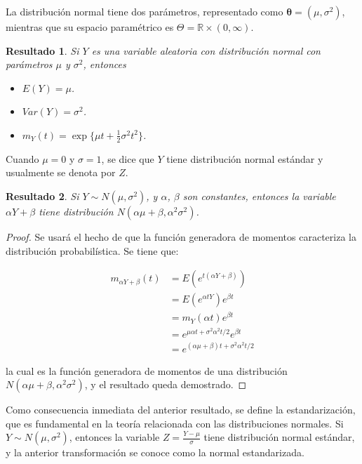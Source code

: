 \documentclass[
  10pt,
  spanish,
]{book}
\providecommand{\tightlist}{%
  \setlength{\itemsep}{0pt}\setlength{\parskip}{0pt}}
\newtheorem{proposition}{Resultado}[chapter]
\theoremstyle{definition}
\theoremstyle{definition}
\theoremstyle{definition}
\theoremstyle{definition}
\theoremstyle{remark}
\begin{document}
La distribución normal tiene dos parámetros, representado como \(\boldsymbol \theta=(\mu,\sigma^2)\), mientras que su espacio paramétrico es \(\Theta=\mathbb{R}\times(0,\infty)\).

\begin{proposition}
\protect\hypertarget{prp:unnamed-chunk-33}{}{\label{prp:unnamed-chunk-33} }Si \(Y\) es una variable aleatoria con distribución normal con parámetros \(\mu\) y \(\sigma^2\), entonces

\begin{itemize}
\tightlist
\item
  \(E(Y)=\mu\).
\item
  \(Var(Y)=\sigma^2\).
\item
  \(m_Y(t)=\exp\{\mu t+\frac{1}{2}\sigma^2t^2\}\).
\end{itemize}
\end{proposition}

Cuando \(\mu=0\) y \(\sigma=1\), se dice que \(Y\) tiene distribución normal estándar y usualmente se denota por \(Z\).

\begin{proposition}
\protect\hypertarget{prp:unnamed-chunk-34}{}{\label{prp:unnamed-chunk-34} }Si \(Y\sim N(\mu,\sigma^2)\), y \(\alpha\), \(\beta\) son constantes, entonces la variable \(\alpha Y+\beta\) tiene distribución \(N(\alpha\mu+\beta,\alpha^2\sigma^2)\).
\end{proposition}

\begin{proof}
{}Se usará el hecho de que la función generadora de momentos caracteriza la distribución probabilística. Se tiene que:

\begin{align*}
m_{\alpha Y+\beta}(t)&=E(e^{t(\alpha Y+\beta)})\\
                     &=E(e^{\alpha tY})e^{\beta t}\\
                     &=m_Y(\alpha t)e^{\beta t}\\
                     &=e^{\mu\alpha t+\sigma^2\alpha^2t/2}e^{\beta t}\\
                     &=e^{(\alpha\mu+\beta)t+\sigma^2\alpha^2t/2}
\end{align*}

la cual es la función generadora de momentos de una distribución \(N(\alpha\mu+\beta,\alpha^2\sigma^2)\), y el resultado queda demostrado.
\end{proof}

Como consecuencia inmediata del anterior resultado, se define la estandarización, que es fundamental en la teoría relacionada con las distribuciones normales. Si \(Y\sim N(\mu,\sigma^2)\), entonces la variable \(Z=\frac{Y-\mu}{\sigma}\) tiene distribución normal estándar, y la anterior transformación se conoce como la normal estandarizada.
\end{document}
